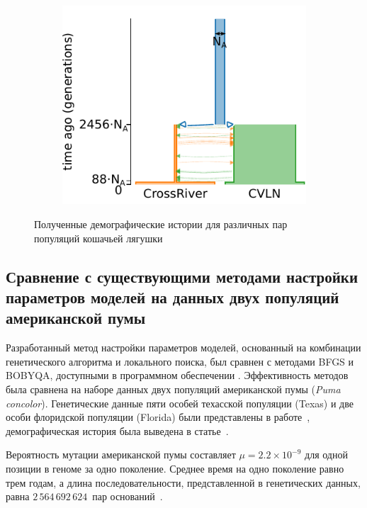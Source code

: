 \begin{figure}[ht]
\begin{subfigure}[b]{.33\textwidth}
    \label{fig:part2:experiments:frog:results_2}
    \end{subfigure}%
    \begin{subfigure}[b]{.33\textwidth}
    \includegraphics[width=\textwidth]{images_experiments/gaboon_forest_frog/picture_1pop_model_cross_cvln.pdf}
    \label{fig:part2:experiments:frog:results_3}
    \end{subfigure}
    \caption{Полученные демографические истории для  различных пар популяций кошачьей лягушки}
    \label{fig:part2:experiments:frog:results}
\end{figure}


\subsection{Сравнение с существующими методами настройки параметров моделей на данных двух популяций американской пумы}

Разработанный метод настройки параметров моделей, основанный на комбинации генетического алгоритма и локального поиска, был сравнен с методами BFGS и BOBYQA, доступными в программном обеспечении \dadi.
Эффективность методов была сравнена на наборе данных двух популяций американской пумы (\textit{Puma concolor}).
Генетические данные пяти особей техасской популяции (Texas) и две особи флоридской популяции (Florida) были представлены в работе~\cite{ochoa2019novo}, демографическая история была выведена в статье~\cite{blischak2020inferring}.

Вероятность мутации американской пумы составляет $\mu = 2.2 \times 10^{-9}$ для одной позиции в геноме за одно поколение.
Среднее время на одно поколение равно трем годам, а длина последовательности, представленной в генетических данных, равна $2{\,}564{\,}692{\,}624$~пар оснований~\cite{ochoa2019novo}.

